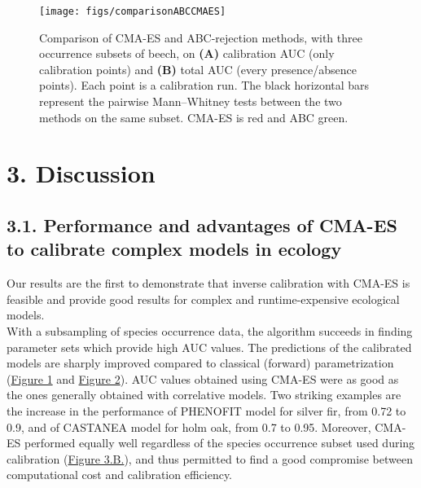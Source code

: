 \documentclass[11pt,]{article}
\begin{document}
\begin{figure}[H]

{\centering \texttt{[image: figs/comparisonABCCMAES]} 

}

\caption{Comparison of CMA-ES and ABC-rejection methods, with three occurrence subsets of beech, on \textbf{(A)} calibration AUC (only calibration points) and \textbf{(B)} total AUC (every presence/absence points). Each point is a calibration run. The black horizontal bars represent the pairwise Mann–Whitney tests between the two methods on the same subset. CMA-ES is red and ABC green.}\label{fig:comparisonABCCMAES}
\end{figure}

\hypertarget{discussion}{%
\section{3. Discussion}\label{discussion}}

\hypertarget{performance-and-advantages-of-cma-es-to-calibrate-complex-models-in-ecology}{%
\subsection{3.1. Performance and advantages of CMA-ES to calibrate
complex models in
ecology}\label{performance-and-advantages-of-cma-es-to-calibrate-complex-models-in-ecology}}

Our results are the first to demonstrate that inverse calibration with
CMA-ES is feasible and provide good results for complex and
runtime-expensive ecological models.\\
With a subsampling of species occurrence data, the algorithm succeeds in
finding parameter sets which provide high AUC values. The predictions of
the calibrated models are sharply improved compared to classical
(forward) parametrization (\hyperref[fig:phenofitmaps]{Figure 1} and
\hyperref[fig:castaneamaps]{Figure 2}). AUC values obtained using CMA-ES
were as good as the ones generally obtained with correlative models. Two
striking examples are the increase in the performance of PHENOFIT model
for silver fir, from 0.72 to 0.9, and of CASTANEA model for holm oak,
from 0.7 to 0.95. Moreover, CMA-ES performed equally well regardless of
the species occurrence subset used during calibration
(\hyperref[fig:cmaesrepAUCcal]{Figure 3.B.}), and thus permitted to find
a good compromise between computational cost and calibration efficiency.
\end{document}

